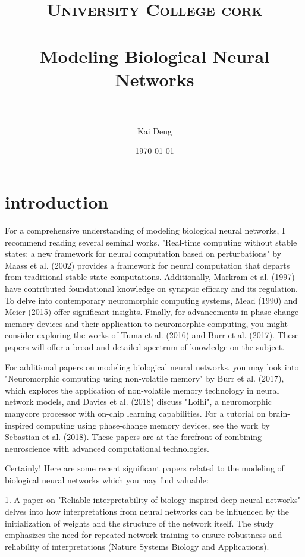 \documentclass[paper=a4, fontsize=11pt]{scrartcl} %
\title{	
\normalfont \normalsize 
\textsc{University College cork} \\ [25pt] %
\horrule{0.5pt} \\[0.4cm] %
\huge Modeling Biological Neural Networks \\ %
\horrule{2pt} \\[0.5cm] %
}
\author{Kai Deng} %
\date{\normalsize\today} %
\numberwithin{equation}{section} %
\numberwithin{figure}{section} %
\numberwithin{table}{section} %
\begin{document}
\maketitle %



\section{introduction}
For a comprehensive understanding of modeling biological neural networks, 
I recommend reading several seminal works. "Real-time computing without stable
 states: a new framework for neural computation based on perturbations" by Maass 
 et al. (2002) provides a framework for neural computation that departs from 
 traditional stable state computations. Additionally, Markram et al. (1997) 
 have contributed foundational knowledge on synaptic efficacy and its regulation. 
 To delve into contemporary neuromorphic computing systems, Mead (1990) and Meier (2015) 
 offer significant insights. Finally, for advancements in phase-change memory devices and 
 their application to neuromorphic computing, you might consider exploring the works of Tuma et al. 
 (2016) and Burr et al. (2017). These papers will offer a broad and detailed spectrum of 
 knowledge on the subject.

 For additional papers on modeling biological neural networks, you may look into 
 "Neuromorphic computing using non-volatile memory" by Burr et al. (2017), 
 which explores the application of non-volatile memory technology in neural network models, 
 and Davies et al. (2018) discuss "Loihi", a neuromorphic manycore processor with on-chip learning 
 capabilities. For a tutorial on brain-inspired computing using phase-change memory devices,
see the work by Sebastian et al. (2018). These papers are at the forefront of combining neuroscience 
with advanced computational technologies.

Certainly! Here are some recent significant papers related to the modeling of biological neural networks which you may find valuable:

1. A paper on "Reliable interpretability of biology-inspired deep neural networks" delves into how interpretations from neural networks can be influenced by the initialization of weights and the structure of the network itself. The study emphasizes the need for repeated network training to ensure robustness and reliability of interpretations (Nature Systems Biology and Applications).
\end{document}
